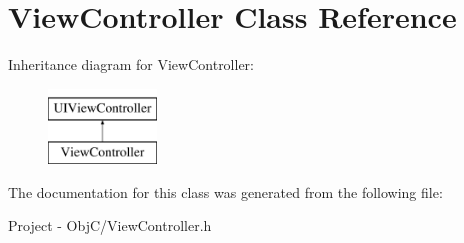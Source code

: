 \hypertarget{interface_view_controller}{}\section{View\+Controller Class Reference}
\label{interface_view_controller}
Inheritance diagram for View\+Controller\+:\begin{figure}[H]
\begin{center}
\leavevmode
\includegraphics[height=2.000000cm]{interface_view_controller}
\end{center}
\end{figure}


The documentation for this class was generated from the following file\+:\begin{DoxyCompactItemize}
\item 
Project -\/ Obj\+C/View\+Controller.\+h\end{DoxyCompactItemize}
